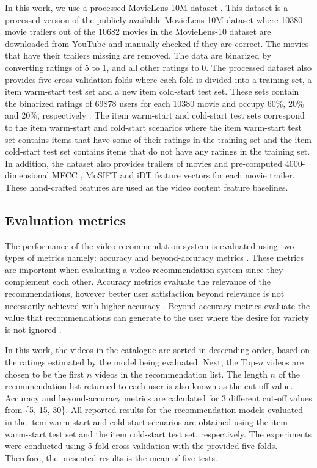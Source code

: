 \documentclass[review]{elsarticle}
\begin{document}
In this work, we use a processed MovieLens-10M dataset \citep{du2018personalized}. This dataset is a processed version of the publicly available MovieLens-10M dataset where 10380 movie trailers out of the 10682 movies in the MovieLens-10 dataset are downloaded from YouTube and manually checked if they are correct. The movies that have their trailers missing are removed. The data are binarized by converting ratings of 5 to 1, and all other ratings to 0. The processed dataset also provides five cross-validation folds where each fold is divided into a training set, a item warm-start test set and a new item cold-start test set. These sets contain the binarized ratings of 69878 users for each 10380 movie and occupy 60\%, 20\% and 20\%, respectively \citep{du2018personalized}. The item warm-start and cold-start test sets correspond to the item warm-start and cold-start scenarios where the item warm-start test set contains items that have some of their ratings in the training set and the item cold-start test set contains items that do not have any ratings in the training set. In addition, the dataset also provides trailers of movies and pre-computed 4000-dimensional \ac{MFCC} \citep{du2018personalized}, \ac{MoSIFT} \citep{chen2009mosift} and \ac{iDT} \citep{wang2013action} feature vectors for each movie trailer. These hand-crafted features are used as the video content feature baselines.




\subsection{Evaluation metrics}
The performance of the video recommendation system is evaluated using two types of metrics namely: accuracy and beyond-accuracy metrics \citep{deldjoo2019movie, shani2011evaluating}. These metrics are important when evaluating a video recommendation system since they complement each other. Accuracy metrics evaluate the relevance of the recommendations, however better user satisfaction beyond relevance is not necessarily achieved with higher accuracy \citep{silveira2019good}. Beyond-accuracy metrics evaluate the value that recommendations can generate to the user where the desire for variety is not ignored \citep{shani2011evaluating}.  

In this work, the videos in the catalogue are sorted in descending order, based on the ratings estimated by the model being evaluated. Next, the Top-$n$ videos are chosen to be the first $n$ videos in the recommendation list. The length $n$ of the recommendation list returned to each user is also known as the cut-off value. Accuracy and beyond-accuracy metrics are calculated for 3 different cut-off values from \{5, 15, 30\}.  All reported results for the recommendation models evaluated in the item warm-start and cold-start scenarios are obtained using the item warm-start test set and the item cold-start test set, respectively. The experiments were conducted using 5-fold cross-validation with the provided five-folds. Therefore, the presented results is the mean of five tests.   
\end{document}
